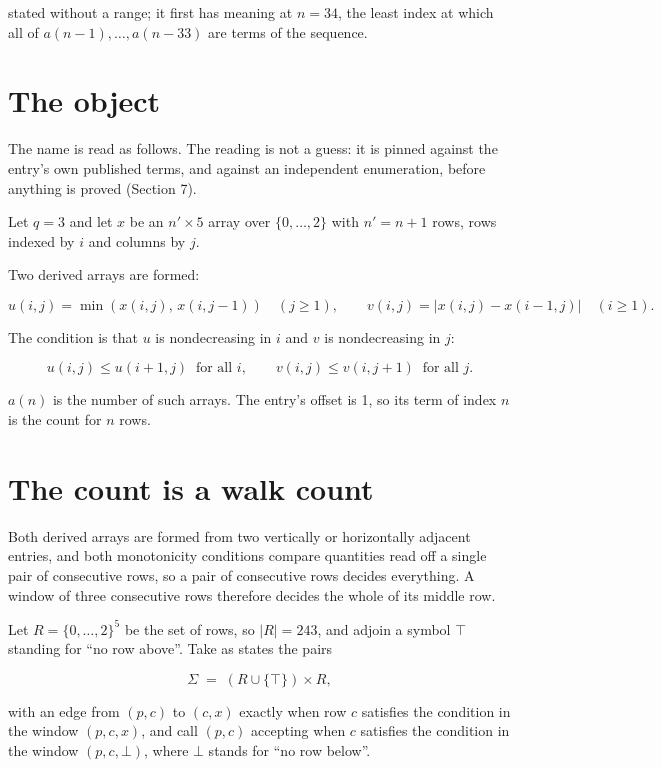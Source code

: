 \documentclass[11pt]{article}
\theoremstyle{definition}
\begin{document}
stated without a range; it first has meaning at $n = 34$, the least index at which all of $a(n-1),\dots,a(n-33)$ are terms of the sequence.

\section{The object}

The name is read as follows. The reading is not a guess: it is pinned against the entry's own published terms, and against an independent enumeration, before anything is proved (Section 7).

Let $q = 3$ and let $x$ be an $n' \times 5$ array over $\{0,\dots,2\}$ with $n' = n + 1$ rows, rows indexed by $i$ and columns by $j$.

Two derived arrays are formed:

\[u(i,j) = \min(x(i,j),\,x(i,j{-}1))\quad (j \ge 1), \qquad v(i,j) = \lvert x(i,j) - x(i{-}1,j)\rvert\quad (i \ge 1).\]

The condition is that $u$ is nondecreasing in $i$ and $v$ is nondecreasing in $j$:

\[u(i,j) \le u(i{+}1,j) \ \text{ for all } i, \qquad v(i,j) \le v(i,j{+}1) \ \text{ for all } j.\]

$a(n)$ is the number of such arrays. The entry's offset is 1, so its term of index $n$ is the count for $n$ rows.

\section{The count is a walk count}

Both derived arrays are formed from two vertically or horizontally adjacent entries, and both monotonicity conditions compare quantities read off a single pair of consecutive rows, so a pair of consecutive rows decides everything. A window of three consecutive rows therefore decides the whole of its middle row.

Let $R = \{0,\dots,2\}^{5}$ be the set of rows, so $|R| = 243$, and adjoin a symbol $\top$ standing for ``no row above''. Take as states the pairs

\[\Sigma \;=\; (R \cup \{\top\}) \times R,\]

with an edge from $(p,c)$ to $(c,x)$ exactly when row $c$ satisfies the condition in the window $(p,c,x)$, and call $(p,c)$ accepting when $c$ satisfies the condition in the window $(p,c,\bot)$, where $\bot$ stands for ``no row below''.
\end{document}

